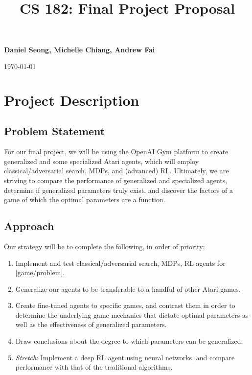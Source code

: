 \documentclass{NSF}
\begin{document}

\title{CS 182: Final Project Proposal}
\begin{center}
	{\bf \large Daniel Seong, Michelle Chiang, Andrew Fai}

	\today
\end{center}

\section{Project Description}

\subsection{Problem Statement}
For our final project, we will be using the OpenAI Gym platform to create generalized and some specialized Atari agents, which will employ classical/adversarial search, MDPs, and (advanced) RL. Ultimately, we are striving to compare the performance of generalized and specialized agents, determine if generalized parameters truly exist, and discover the factors of a game of which the optimal parameters are a function.

\subsection{Approach}
Our strategy will be to complete the following, in order of priority:
\begin{enumerate}
\item Implement and test classical/adversarial search, MDPs, RL agents for [game/problem].
\item Generalize our agents to be transferable to a handful of other Atari games.
\item Create fine-tuned agents to specific games, and contrast them in order to determine the underlying game mechanics that dictate optimal parameters as well as the effectiveness of generalized parameters.
\item Draw conclusions about the degree to which parameters can be generalized.
\item \emph{Stretch}: Implement a deep RL agent using neural networks, and compare performance with that of the traditional algorithms.
\end{enumerate}
\end{document}

